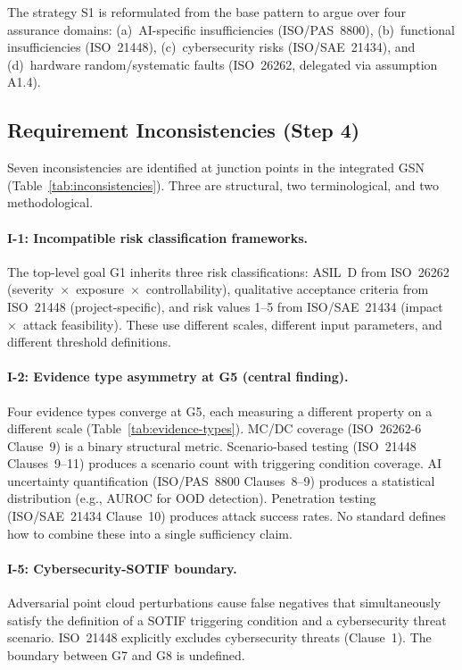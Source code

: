 The strategy S1 is reformulated from the base pattern to argue over four
assurance domains: (a)~AI-specific insufficiencies (ISO/PAS~8800),
(b)~functional insufficiencies (ISO~21448), (c)~cybersecurity risks
(ISO/SAE~21434), and (d)~hardware random/systematic faults (ISO~26262,
delegated via assumption A1.4).

\subsection{Requirement Inconsistencies (Step 4)}

Seven inconsistencies are identified at junction points in the integrated
GSN (Table~\ref{tab:inconsistencies}). Three are structural, two
terminological, and two methodological.

\paragraph{I-1: Incompatible risk classification frameworks.}
The top-level goal G1 inherits three risk classifications: ASIL~D from
ISO~26262 (severity~$\times$~exposure~$\times$~controllability),
qualitative acceptance criteria from ISO~21448 (project-specific), and
risk values 1--5 from ISO/SAE~21434 (impact~$\times$~attack feasibility).
These use different scales, different input parameters, and different
threshold definitions.

\paragraph{I-2: Evidence type asymmetry at G5 (central finding).}
Four evidence types converge at G5, each measuring a different property
on a different scale (Table~\ref{tab:evidence-types}). MC/DC coverage
(ISO~26262-6 Clause~9) is a binary structural metric. Scenario-based
testing (ISO~21448 Clauses~9--11) produces a scenario count with
triggering condition coverage. AI uncertainty quantification (ISO/PAS~8800
Clauses~8--9) produces a statistical distribution (e.g., AUROC for OOD
detection). Penetration testing (ISO/SAE~21434 Clause~10) produces
attack success rates. No standard defines how to combine these into a
single sufficiency claim.

\paragraph{I-5: Cybersecurity-SOTIF boundary.}
Adversarial point cloud perturbations cause false negatives that
simultaneously satisfy the definition of a SOTIF triggering condition
and a cybersecurity threat scenario. ISO~21448 explicitly excludes
cybersecurity threats (Clause~1). The boundary between G7 and G8 is
undefined.

